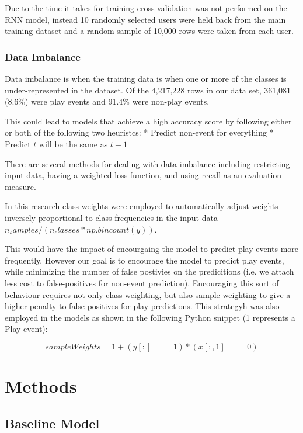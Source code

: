 Due to the time it takes for training cross validation was not performed on the RNN model, instead 10 randomly selected users were held back from the main training dataset and a random sample of 10,000 rows were taken from each user.

\subsubsection{Data Imbalance}

Data imbalance is when the training data is when one or more of the classes is under-represented in the dataset. Of the 4,217,228 rows in our data set, 361,081 (8.6\%) were play events and 91.4\% were non-play events.  

This could lead to models that achieve a high accuracy score by following either or both of the following two heuristcs:
* Predict non-event for everything
* Predict $t$ will be the same as $t-1$

There are several methods for dealing with data imbalance \parencite{Brownlee} including restricting input data, having a weighted loss function, and using recall as an evaluation measure.

In this research class weights were employed to automatically adjust weights inversely proportional to class frequencies in the input data $n_samples / (n_classes * np.bincount(y))$.

This would have the impact of encourgaing the model to predict play events more frequently. However our goal is to encourage the model to predict play events, while minimizing the number of false postivies on the predicitions (i.e. we attach less cost to false-positives for non-event prediction). Encouraging this sort of behaviour requires not only class weighting, but also sample weighting to give a higher penalty to false positives for play-predictions. This strategyh was also employed in the models as shown in the following Python snippet (1 represents a Play event):

$$sampleWeights =  1+(y[:] == 1) * (x[:,1] ==0)$$

\section{Methods}

\subsection{Baseline Model}

